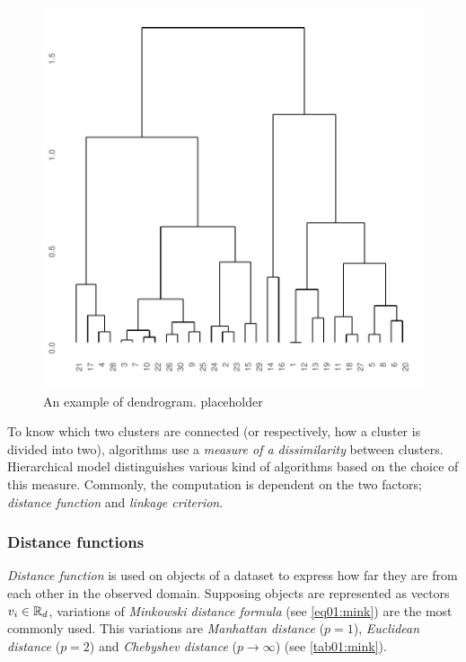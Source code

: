 \begin{figure}\centering
	\includegraphics[width=\linewidth]{img/dendro}
	\caption{An example of dendrogram. placeholder }
	\label{fig01:dendro}
\end{figure}

To know which two clusters are connected (or respectively, how a cluster is divided into two), algorithms use a \emph{measure of a dissimilarity} between clusters.  
Hierarchical model distinguishes various kind of algorithms based on the choice of this measure. Commonly, the computation is dependent on the two factors; \emph{distance function} and \emph{linkage criterion}. 

\subsubsection{Distance functions}

\emph{Distance function} is used on objects of a dataset to express how far they are from each other in the observed domain. Supposing objects are represented as vectors $v_i \in \mathbb{R}_d$, variations of \emph{Minkowski distance formula} (see \ref{eq01:mink}) are the most commonly used.
This variations are \emph{Manhattan distance} ($p=1$), \emph{Euclidean distance} ($p=2$) and \emph{Chebyshev distance} ($p \to \infty$) (see \ref{tab01:mink}).

